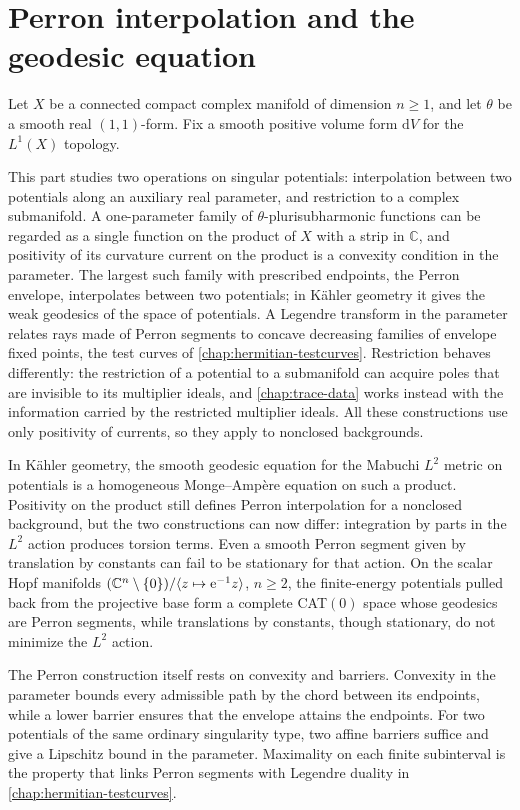 \chapter{Perron interpolation and the geodesic equation}
\label{chap:hermitian-rays}

Let $X$ be a connected compact complex manifold of dimension $n\geq1$, and let $\theta$ be a smooth real $(1,1)$-form. Fix a smooth positive volume form $\mathrm{d}V$ for the $L^1(X)$ topology.

This part studies two operations on singular potentials: interpolation between two potentials along an auxiliary real parameter, and restriction to a complex submanifold. A one-parameter family of $\theta$-plurisubharmonic functions can be regarded as a single function on the product of $X$ with a strip in $\mathbb C$, and positivity of its curvature current on the product is a convexity condition in the parameter. The largest such family with prescribed endpoints, the Perron envelope, interpolates between two potentials; in K\"ahler geometry it gives the weak geodesics of the space of potentials. A Legendre transform in the parameter relates rays made of Perron segments to concave decreasing families of envelope fixed points, the test curves of \cref{chap:hermitian-testcurves}. Restriction behaves differently: the restriction of a potential to a submanifold can acquire poles that are invisible to its multiplier ideals, and \cref{chap:trace-data} works instead with the information carried by the restricted multiplier ideals. All these constructions use only positivity of currents, so they apply to nonclosed backgrounds.

In K\"ahler geometry, the smooth geodesic equation for the Mabuchi $L^2$ metric on potentials is a homogeneous Monge--Amp\`ere equation on such a product. Positivity on the product still defines Perron interpolation for a nonclosed background, but the two constructions can now differ: integration by parts in the $L^2$ action produces torsion terms. Even a smooth Perron segment given by translation by constants can fail to be stationary for that action. On the scalar Hopf manifolds $(\mathbb C^n\setminus\{0\})/\langle z\mapsto\mathrm e^{-1}z\rangle$, $n\geq2$, the finite-energy potentials pulled back from the projective base form a complete CAT$(0)$ space whose geodesics are Perron segments, while translations by constants, though stationary, do not minimize the $L^2$ action.

The Perron construction itself rests on convexity and barriers. Convexity in the parameter bounds every admissible path by the chord between its endpoints, while a lower barrier ensures that the envelope attains the endpoints. For two potentials of the same ordinary singularity type, two affine barriers suffice and give a Lipschitz bound in the parameter. Maximality on each finite subinterval is the property that links Perron segments with Legendre duality in \cref{chap:hermitian-testcurves}.

